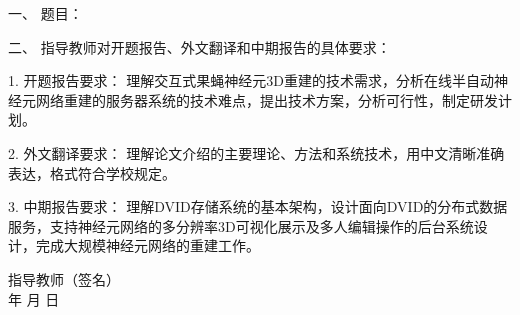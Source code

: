 \newpage

\thispagestyle{empty}

{
\setlength{\parindent}{0em}
\renewcommand{\baselinestretch}{2}
\songti\sihao\bfseries

一、 \; 题目： \; \underline{\makebox[24em]{\zjutitlec}}

\vspace{2em}

二、 \; 指导教师对开题报告、外文翻译和中期报告的具体要求：

1. \; 开题报告要求： \; 理解交互式果蝇神经元3D重建的技术需求，分析在线半自动神经元网络重建的服务器系统的技术难点，提出技术方案，分析可行性，制定研发计划。

2. \; 外文翻译要求： \; 理解论文介绍的主要理论、方法和系统技术，用中文清晰准确表达，格式符合学校规定。

3. \; 中期报告要求： \; 理解DVID存储系统的基本架构，设计面向DVID的分布式数据服务，支持神经元网络的多分辨率3D可视化展示及多人编辑操作的后台系统设计，完成大规模神经元网络的重建工作。

\vspace{8cm}
}

{
\songti\xiaosi\bfseries
\begin{flushright}
  指导教师（签名） \; \underline{\hspace{6em}} \\
  年 \qquad 月 \qquad 日
\end{flushright}
}

